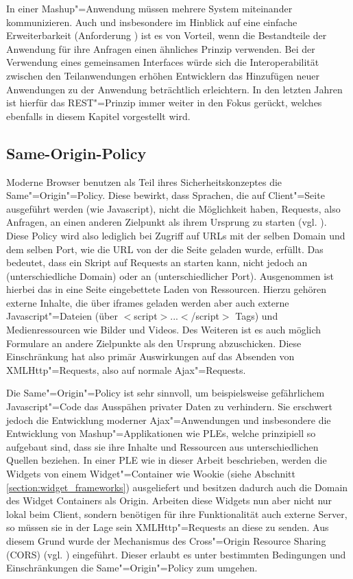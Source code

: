 In einer Mashup"=Anwendung müssen mehrere System miteinander kommunizieren. Auch und insbesondere im Hinblick auf eine einfache Erweiterbarkeit (Anforderung ) ist es von Vorteil, wenn die Bestandteile der Anwendung für ihre Anfragen einen ähnliches Prinzip verwenden. Bei der Verwendung eines gemeinsamen Interfaces würde sich die Interoperabilität zwischen den Teilanwendungen erhöhen Entwicklern das Hinzufügen neuer Anwendungen zu der Anwendung beträchtlich erleichtern. In den letzten Jahren ist hierfür das REST"=Prinzip immer weiter in den Fokus gerückt, welches ebenfalls in diesem Kapitel vorgestellt wird.
% 
\subsection{Same-Origin-Policy}\label{section:same_origin_policy}
Moderne Browser benutzen als Teil ihres Sicherheitskonzeptes die Same"=Origin"=Policy. Diese bewirkt, dass Sprachen, die auf Client"=Seite ausgeführt werden (wie Javascript), nicht die Möglichkeit haben, Requests, also Anfragen, an einen anderen Zielpunkt als ihrem Ursprung zu starten (vgl. \cite{Ruderman2008}). Diese Policy wird also lediglich bei Zugriff auf URLs mit der selben Domain und dem selben Port, wie die URL von der die Seite geladen wurde, erfüllt. Das bedeutet, dass ein Skript auf  Requests an  starten kann, nicht jedoch an  (unterschiedliche Domain) oder an  (unterschiedlicher Port). Ausgenommen ist hierbei das in eine Seite eingebettete Laden von Ressourcen. Hierzu gehören externe Inhalte, die über iframes geladen werden aber auch externe Javascript"=Dateien (über $<$script$>$...$<$/script$>$ Tags) und Medienressourcen wie Bilder und Videos. Des Weiteren ist es auch möglich Formulare an andere Zielpunkte als den Ursprung abzuschicken. Diese Einschränkung hat also primär Auswirkungen auf das Absenden von XMLHttp"=Requests, also auf normale Ajax"=Requests.

Die Same"=Origin"=Policy ist sehr sinnvoll, um beispielsweise gefährlichem Javascript"=Code das Ausspähen privater Daten zu verhindern. Sie erschwert jedoch die Entwicklung moderner Ajax"=Anwendungen und insbesondere die Entwicklung von Mashup"=Applikationen wie PLEs, welche prinzipiell so aufgebaut sind, dass sie ihre Inhalte und Ressourcen aus unterschiedlichen Quellen beziehen. In einer PLE wie in dieser Arbeit beschrieben, werden die Widgets von einem Widget"=Container wie Wookie (siehe Abschnitt \ref{section:widget_frameworks}) ausgeliefert und besitzen dadurch auch die Domain des Widget Containers als Origin. Arbeiten diese Widgets nun aber nicht nur lokal beim Client, sondern benötigen für ihre Funktionalität auch externe Server, so müssen sie in der Lage sein XMLHttp"=Requests an diese zu senden. Aus diesem Grund wurde der Mechanismus des Cross"=Origin Resource Sharing (CORS) (vgl. \cite{vanKesteren2012}) eingeführt. Dieser erlaubt es unter bestimmten Bedingungen und Einschränkungen die Same"=Origin"=Policy zum umgehen.

